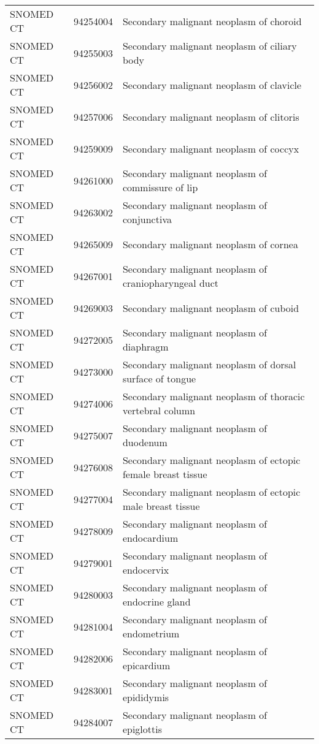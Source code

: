 \begin{longtable}{p{}p{}p{}}
  SNOMED CT & 94254004 & Secondary malignant neoplasm of choroid \\ 
  SNOMED CT & 94255003 & Secondary malignant neoplasm of ciliary body \\ 
  SNOMED CT & 94256002 & Secondary malignant neoplasm of clavicle \\ 
  SNOMED CT & 94257006 & Secondary malignant neoplasm of clitoris \\ 
  SNOMED CT & 94259009 & Secondary malignant neoplasm of coccyx \\ 
  SNOMED CT & 94261000 & Secondary malignant neoplasm of commissure of lip \\ 
  SNOMED CT & 94263002 & Secondary malignant neoplasm of conjunctiva \\ 
  SNOMED CT & 94265009 & Secondary malignant neoplasm of cornea \\ 
  SNOMED CT & 94267001 & Secondary malignant neoplasm of craniopharyngeal duct \\ 
  SNOMED CT & 94269003 & Secondary malignant neoplasm of cuboid \\ 
  SNOMED CT & 94272005 & Secondary malignant neoplasm of diaphragm \\ 
  SNOMED CT & 94273000 & Secondary malignant neoplasm of dorsal surface of tongue \\ 
  SNOMED CT & 94274006 & Secondary malignant neoplasm of thoracic vertebral column \\ 
  SNOMED CT & 94275007 & Secondary malignant neoplasm of duodenum \\ 
  SNOMED CT & 94276008 & Secondary malignant neoplasm of ectopic female breast tissue \\ 
  SNOMED CT & 94277004 & Secondary malignant neoplasm of ectopic male breast tissue \\ 
  SNOMED CT & 94278009 & Secondary malignant neoplasm of endocardium \\ 
  SNOMED CT & 94279001 & Secondary malignant neoplasm of endocervix \\ 
  SNOMED CT & 94280003 & Secondary malignant neoplasm of endocrine gland \\ 
  SNOMED CT & 94281004 & Secondary malignant neoplasm of endometrium \\ 
  SNOMED CT & 94282006 & Secondary malignant neoplasm of epicardium \\ 
  SNOMED CT & 94283001 & Secondary malignant neoplasm of epididymis \\ 
  SNOMED CT & 94284007 & Secondary malignant neoplasm of epiglottis \\ 

\end{longtable}
